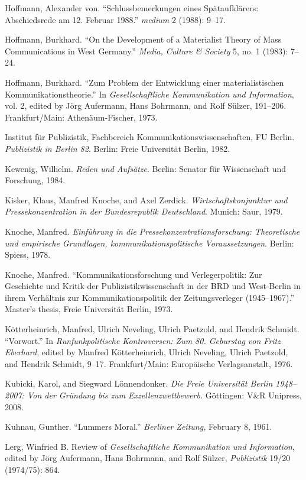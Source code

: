 \documentclass{tufte-handout}
\begin{document}
\begin{hangparas}{.25in}{1}
Hoffmann, Alexander von. ``Schlussbemerkungen eines Spätaufklärers:
Abschiedsrede am 12. Februar 1988.'' \emph{medium} 2 (1988): 9--17.

Hoffmann, Burkhard. ``On the Development of a Materialist Theory of Mass
Communications in West Germany.'' \emph{Media, Culture \& Society} 5,
no. 1 (1983): 7--24.

Hoffmann, Burkhard. ``Zum Problem der Entwicklung einer
materialistischen Kommunikationstheorie.'' In \emph{Gesellschaftliche
Kommunikation und Information}, vol. 2, edited by Jörg Aufermann, Hans
Bohrmann, and Rolf Sülzer, 191--206. Frankfurt/Main: Athenäum-Fischer,
1973.

Institut für Publizistik, Fachbereich Kommunikationswissenschaften, FU
Berlin. \emph{Publizistik in Berlin 82}. Berlin: Freie Universität
Berlin, 1982.

Kewenig, Wilhelm. \emph{Reden und Aufsätze}. Berlin: Senator für
Wissenschaft und Forschung, 1984.

Kisker, Klaus, Manfred Knoche, and Axel Zerdick.
\emph{Wirtschaftskonjunktur und Pressekonzentration in der
Bundesrepublik Deutschland}. Munich: Saur, 1979.

Knoche, Manfred. \emph{Einführung in die Pressekonzentrationsforschung:
Theoretische und empirische Grundlagen, kommunikationspolitische
Voraussetzungen}. Berlin: Spiess, 1978.

Knoche, Manfred. ``Kommunikationsforschung und Verlegerpolitik: Zur
Geschichte und Kritik der Publizistikwissenschaft in der BRD und
West-Berlin in ihrem Verhältnis zur Kommunikationspolitik der
Zeitungsverleger (1945--1967).'' Master's thesis, Freie Universität
Berlin, 1973.

Kötterheinrich, Manfred, Ulrich Neveling, Ulrich Paetzold, and Hendrik
Schmidt. ``Vorwort.'' In \emph{Runfunkpolitische Kontroversen: Zum 80.
Geburstag von Fritz Eberhard}, edited by Manfred Kötterheinrich, Ulrich
Neveling, Ulrich Paetzold, and Hendrik Schmidt, 9--17. Frankfurt/Main:
Europäische Verlagsanstalt, 1976.

Kubicki, Karol, and Siegward Lönnendonker. \emph{Die Freie Universität
Berlin 1948--2007: Von der Gründung bis zum Exzellenzwettbewerb.}
Göttingen: V\&R Unipress, 2008.

Kuhnau, Gunther. ``Lummers Moral.'' \emph{Berliner Zeitung,} February 8,
1961.

Lerg, Winfried B. Review of \emph{Gesellschaftliche Kommunikation und
Information}, edited by Jörg Aufermann, Hans Bohrmann, and Rolf Sülzer,
\emph{Publizistik} 19/20 (1974/75): 864.


\end{hangparas}
\end{document}
